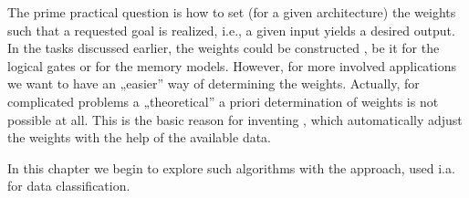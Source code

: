 \documentclass[a4paper,12pt,polish]{jupyterBook}
\begin{document}
\sphinxAtStartPar
The prime practical question is how to set (for a given architecture) the weights such that a requested goal is realized, i.e., a given input yields a desired output.
In the tasks discussed earlier, the weights could be constructed , be it for the logical gates or for the memory models. However, for more involved applications we want to have an „easier” way of determining the weights. Actually, for complicated problems a „theoretical” a priori determination of weights is not possible at all. This is the basic reason for inventing , which automatically adjust the weights with the help of the available data.

\sphinxAtStartPar
In this chapter we begin to explore such algorithms with the  approach, used i.a. for data classification.
\end{document}

